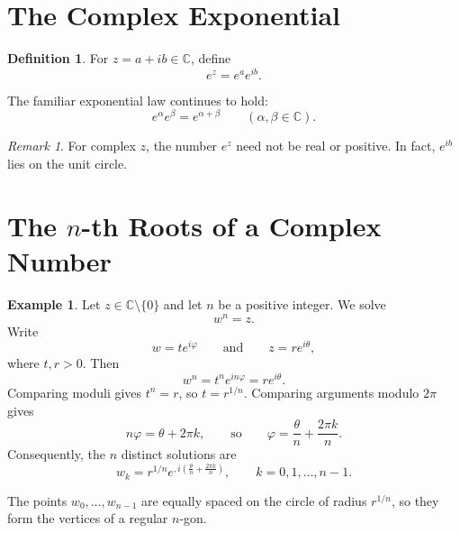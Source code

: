 \documentclass[11pt]{article}
\theoremstyle{definition}
\newtheorem{definition}{Definition}
\newtheorem{example}{Example}
\theoremstyle{remark}
\newtheorem*{remark}{Remark}
\newcommand{\C}{\mathbb{C}}
\begin{document}
\section{The Complex Exponential}

\begin{definition}
For $z=a+ib\in\C$, define
\[
  e^z=e^a e^{ib}.
\]
\end{definition}

The familiar exponential law continues to hold:
\[
  e^\alpha e^\beta=e^{\alpha+\beta}
  \qquad (\alpha,\beta\in\C).
\]

\begin{remark}
For complex $z$, the number $e^z$ need not be real or positive.  In fact,
$e^{ib}$ lies on the unit circle.
\end{remark}

\section{The \texorpdfstring{$n$}{n}-th Roots of a Complex Number}

\begin{example}
Let $z\in\C\setminus\{0\}$ and let $n$ be a positive integer.  We solve
\[
  w^n=z.
\]
Write
\[
  w=te^{i\varphi}
  \qquad\text{and}\qquad
  z=re^{i\theta},
\]
where $t,r>0$.  Then
\[
  w^n=t^n e^{in\varphi}=re^{i\theta}.
\]
Comparing moduli gives $t^n=r$, so $t=r^{1/n}$.  Comparing arguments modulo
$2\pi$ gives
\[
  n\varphi=\theta+2\pi k,
  \qquad\text{so}\qquad
  \varphi=\frac{\theta}{n}+\frac{2\pi k}{n}.
\]
Consequently, the $n$ distinct solutions are
\[
  \boxed{
    w_k=r^{1/n}
    e^{,i\left(\frac{\theta}{n}+\frac{2\pi k}{n}\right)}
  },
  \qquad k=0,1,\ldots,n-1.
\]
\end{example}

The points $w_0,\ldots,w_{n-1}$ are equally spaced on the circle of radius
$r^{1/n}$, so they form the vertices of a regular $n$-gon.

\begin{center}
\end{center}
\end{document}
